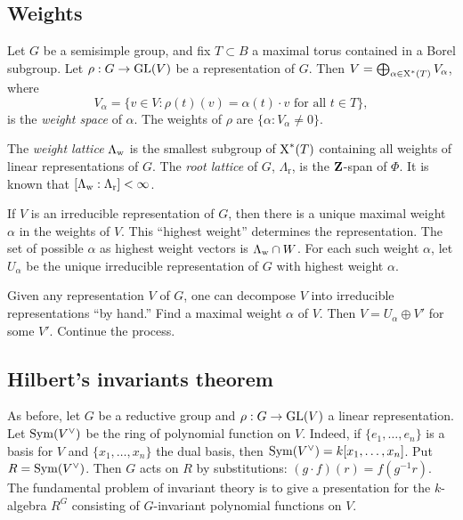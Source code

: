 \begin{example}[$n=2$]
[do this]
\end{example}

\begin{example}[$n=3$]
[do this]
\end{example}





\subsection{Weights}

Let $G$ be a semisimple group, and fix $T\subset B$ a maximal torus contained 
in a Borel subgroup. Let $\rho:G\to \operatorname{GL}(V)$ be a representation of 
$G$. Then $V=\bigoplus_{\alpha\in \operatorname{X}^\ast(T)} V_\alpha$, where 
\[
  V_\alpha = \{v\in V:\rho(t)(v) = \alpha(t)\cdot v\text{ for all }t\in T\} ,
\]
is the \emph{weight space} of $\alpha$. The weights of $\rho$ are 
$\{\alpha:V_\alpha\ne 0\}$. 

The \emph{weight lattice} $\Lambda_{\mathrm{w}}$ is the smallest subgroup of 
$\operatorname{X}^\ast(T)$ containing all weights of linear representations of $G$. 
The \emph{root lattice} of $G$, $\Lambda_\mathrm{r}$, is the $\mathbf{Z}$-span of 
$\Phi$. It is known that $[\Lambda_{\mathrm{w}}:\Lambda_\mathrm{r}]<\infty$. 

If $V$ is an irreducible representation of $G$, then there is a unique maximal 
weight $\alpha$ in the weights of $V$. This ``highest weight'' determines the 
representation. The set of possible $\alpha$ as highest weight vectors is 
$\Lambda_{\mathrm{w}}\cap W$. For each such weight $\alpha$, let $U_\alpha$ be the 
unique irreducible representation of $G$ with highest weight $\alpha$. 

Given any representation $V$ of $G$, one can decompose $V$ into irreducible 
representations ``by hand.'' Find a maximal weight $\alpha$ of $V$. Then 
$V=U_\alpha\oplus V'$ for some $V'$. Continue the process. 





\subsection{Hilbert's invariants theorem}

As before, let $G$ be a reductive group and $\rho:G\to \operatorname{GL}(V)$ a 
linear representation. Let $\operatorname{Sym}(V^\vee)$ be the ring of polynomial 
function on $V$. Indeed, if $\{e_1,\dots,e_n\}$ is a basis for $V$ and 
$\{x_1,\dots,x_n\}$ the dual basis, then 
$\operatorname{Sym}(V^\vee) = k[x_1,\dots,x_n]$. Put $R=\operatorname{Sym}(V^\vee)$. Then $G$ 
acts on $R$ by substitutions: $(g\cdot f)(r) = f(g^{-1} r)$. The fundamental 
problem of invariant theory is to give a presentation for the 
$k$-algebra $R^G$ consisting of $G$-invariant polynomial functions on $V$. 

